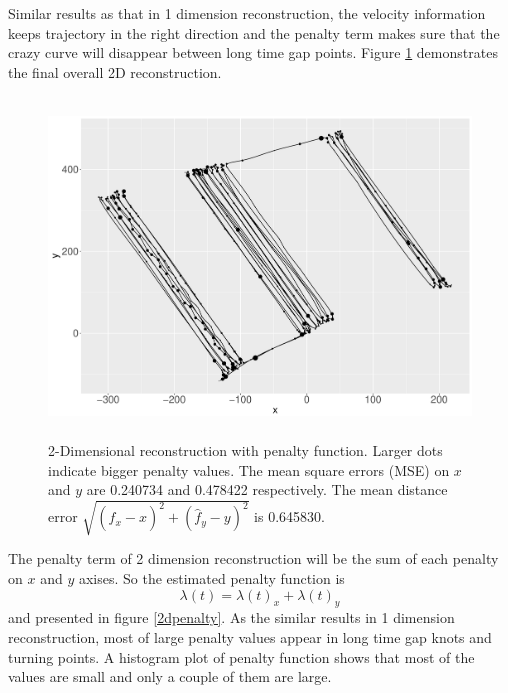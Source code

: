 Similar results as that in 1 dimension reconstruction, the velocity information keeps trajectory in the right direction and the penalty term makes sure that the crazy curve will disappear between long time gap points. Figure \ref{2dxy} demonstrates the final overall 2D reconstruction. 

\begin{figure}
  \centering
    \includegraphics[width=\textwidth,height=9cm]{Chapters/02TractorSplineTheory/plot/ggplot/ggRealdataXYPenaltyPath.pdf} 
  \caption{2-Dimensional reconstruction with penalty function. Larger dots indicate bigger penalty values. The mean square errors (MSE) on $x$ and $y$ are 0.240734 and 0.478422 respectively. The mean distance error $\sqrt{(\hat{f}_x-x)^2+ (\hat{f}_y-y)^2}$ is 0.645830.}\label{2dxy}
\end{figure}

The penalty term of 2 dimension reconstruction will be the sum of each penalty on $x$ and $y$ axises. So the estimated penalty function is
\begin{equation}
\lambda(t)=\lambda(t)_x+\lambda(t)_y
\end{equation}
and presented in figure \ref{2dpenalty}. As the similar results in 1 dimension reconstruction, most of large penalty values appear in long time gap knots and turning points. A histogram plot of penalty function shows that most of the values are small and only a couple of them are large. 

